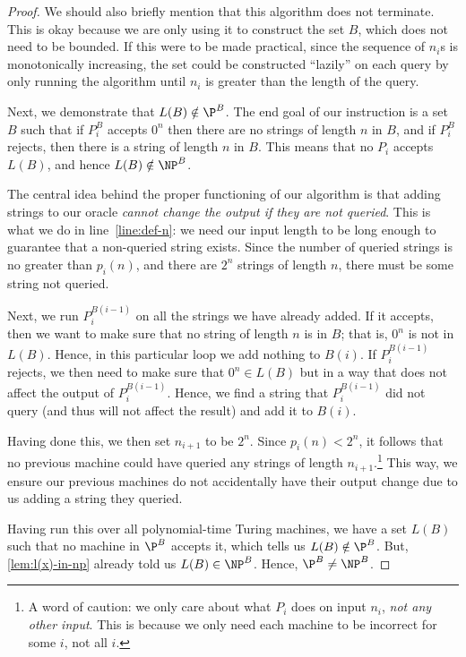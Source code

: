 \documentclass[english,12pt]{reedthesis}
\theoremstyle{plain}
\theoremstyle{definition}
\theoremstyle{remark}
\begin{document}
\begin{proof}
  We should also briefly mention that this algorithm does not terminate. This is
  okay because we are only using it to construct the set $B$, which does not
  need to be bounded. If this were to be made practical, since the sequence of
  $n_{i}$s is monotonically increasing, the set could be constructed ``lazily''
  on each query by only running the algorithm until $n_{i}$ is greater than the
  length of the query.

  Next, we demonstrate that $L(B) \notin \P^{B}$. The end goal of our instruction is
  a set $B$ such that if $P_{i}^{B}$ accepts $0^{n}$ then there are no strings
  of length $n$ in $B$, and if $P_{i}^{B}$ rejects, then there is a string of
  length $n$ in $B$. This means that no $P_{i}$ accepts $L(B)$, and hence
  $L(B) \notin \NP^{B}$.

  The central idea behind the proper functioning of our algorithm is that adding
  strings to our oracle \emph{cannot change the output if they are not queried}.
  This is what we do in line~\ref{line:def-n}: we need our input length to be
  long enough to guarantee that a non-queried string exists. Since the number of
  queried strings is no greater than $p_{i}(n)$, and there are $2^{n}$ strings
  of length $n$, there must be some string not queried.

  Next, we run $P_{i}^{B(i-1)}$ on all the strings we have already added. If it
  accepts, then we want to make sure that no string of length $n$ is in $B$;
  that is, $0^{n}$ is not in $L(B)$. Hence, in this particular loop we add
  nothing to $B(i)$. If $P_{i}^{B(i-1)}$ rejects, we then need to make sure that
  $0^{n} \in L(B)$ but in a way that does not affect the output of
  $P_{i}^{B(i-1)}$. Hence, we find a string that $P_{i}^{B(i-1)}$ did not query
  (and thus will not affect the result) and add it to $B(i)$.

  Having done this, we then set $n_{i+1}$ to be $2^{n}$. Since
  $p_{i}(n) < 2^{n}$, it follows that no previous machine could have queried any
  strings of length $n_{i+1}$.\footnote{A word of caution: we only care about
    what $P_{i}$ does on input $n_{i}$, \emph{not any other input}. This is
    because we only need each machine to be incorrect for some $i$, not all
    $i$.} This way, we ensure our previous machines do not accidentally have
  their output change due to us adding a string they queried.

  Having run this over all polynomial-time Turing machines, we have a set $L(B)$
  such that no machine in $\P^{B}$ accepts it, which tells us $L(B) \notin \P^{B}$.
  But, \cref{lem:l(x)-in-np} already told us $L(B) \in \NP^{B}$. Hence,
  $\P^{B} \ne \NP^{B}$.
\end{proof}
\end{document}
